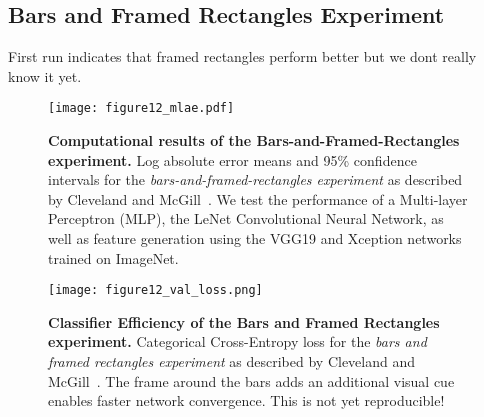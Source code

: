 \subsection{Bars and Framed Rectangles Experiment}

First run indicates that framed rectangles perform better but we dont really know it yet.

\begin{figure*}[t]
	  \texttt{[image: figure12\_mlae.pdf]}
  \caption{\textbf{Computational results of the Bars-and-Framed-Rectangles experiment.} Log absolute error means and 95\% confidence intervals for the \emph{bars-and-framed-rectangles experiment} as described by Cleveland and McGill~\cite{cleveland_mcgill}. We test the performance of a Multi-layer Perceptron (MLP), the LeNet Convolutional Neural Network, as well as feature generation using the VGG19 and Xception networks trained on ImageNet.}
	\label{fig:figure12_mlae}
\end{figure*}

\begin{figure}[t]
	  \texttt{[image: figure12\_val\_loss.png]}
  \caption{\textbf{Classifier Efficiency of the Bars and Framed Rectangles experiment.} Categorical Cross-Entropy loss for the \emph{bars and framed rectangles experiment} as described by Cleveland and McGill~\cite{cleveland_mcgill}. The frame around the bars adds an additional visual cue enables faster network convergence. This is not yet reproducible!}
	\label{fig:figure12_val_loss}
\end{figure}
